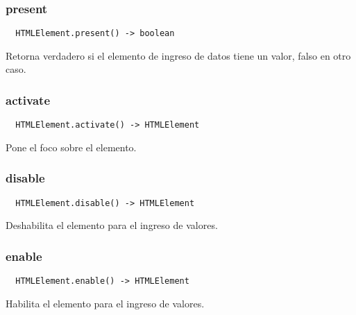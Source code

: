 \subsubsection*{present}
\begin{verbatim}
  HTMLElement.present() -> boolean
\end{verbatim}
Retorna verdadero si el elemento de ingreso de datos tiene un valor, falso en
otro caso.

\subsubsection*{activate}
\begin{verbatim}
  HTMLElement.activate() -> HTMLElement
\end{verbatim}
Pone el foco sobre el elemento.

\subsubsection*{disable}
\begin{verbatim}
  HTMLElement.disable() -> HTMLElement
\end{verbatim}
Deshabilita el elemento para el ingreso de valores.

\subsubsection*{enable}
\begin{verbatim}
  HTMLElement.enable() -> HTMLElement
\end{verbatim}
Habilita el elemento para el ingreso de valores.
